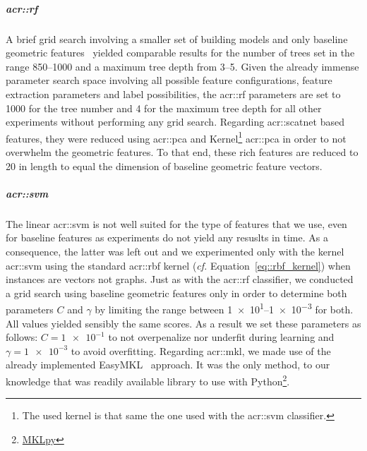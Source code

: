                 \subparagraph{\acrshort*{acr::rf}}
                    A brief grid search involving a smaller set of building models and only baseline geometric features~\parencite{ennafii2018qualificationunannotated} yielded comparable results for the number of trees set in the range \numrange{850}{1000} and a maximum tree depth from \numrange{3}{5}.
                    Given the already immense parameter search space involving all possible feature configurations, feature extraction parameters and label possibilities, the \gls{acr::rf} parameters are set to \num{1000} for the tree number and 4 for the maximum tree depth for all other experiments without performing any grid search.
                    Regarding \gls{acr::scatnet} based features, they were reduced using \gls{acr::pca} and Kernel\footnote{The used kernel is that same the one used with the \gls{acr::svm} classifier.} \gls{acr::pca} in order to not overwhelm the geometric features.
                    To that end, these rich features are reduced to 20 in length to equal the dimension of baseline geometric feature vectors.

                \subparagraph{\acrshort*{acr::svm}}
                    The linear \gls{acr::svm} is not well suited for the type of features that we use, even for baseline features as experiments do not yield any resuslts in time.
                    As a consequence, the latter was left out and we experimented only with the kernel \gls{acr::svm} using the standard \gls{acr::rbf} kernel (\textit{cf.} Equation~\ref{eq::rbf_kernel}) when instances are vectors not graphs.
                    Just as with the \gls{acr::rf} classifier, we conducted a grid search using baseline geometric features only in order to determine both parameters \(C\) and \(\gamma\) by limiting the range between \numrange[range-phrase={ and }]{1e1}{1e-3} for both.
                    All values yielded sensibly the same scores.
                    As a result we set these parameters as follows: \(C = \num{1e-1}\) to not overpenalize nor underfit during learning and \(\gamma = \num{1e-3}\) to avoid overfitting.
                    Regarding \gls{acr::mkl}, we made use of the already implemented EasyMKL~\parencite{aiolli2015easymkl} approach.
                    It was the only method, to our knowledge that was readily available library to use with Python\footnote{\href{https://github.com/IvanoLauriola/MKLpy}{MKLpy}}.
    
